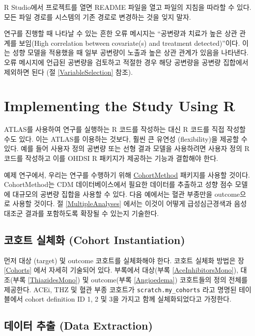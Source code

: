 \documentclass[11pt]{book}
\theoremstyle{definition}
\theoremstyle{definition}
\theoremstyle{definition}
\theoremstyle{remark}
\begin{document}
R Studio에서 프로젝트를 열면 README 파일을 열고 파일의 지침을 따라할 수
있다. 모든 파일 경로를 시스템의 기존 경로로 변경하는 것을 잊지 말자.

연구를 진행할 때 나타날 수 있는 흔한 오류 메시지는 ``공변량과 치료가
높은 상관 관계를 보임(High correlation between covariate(s) and
treatment detected)''이다. 이는 성향 모델을 적용했을 때 일부 공변량이
노출과 높은 상관 관계가 있음을 나타낸다. 오류 메시지에 언급된 공변량을
검토하고 적절한 경우 해당 공변량을 공변량 집합에서 제외하면 된다 (절
\ref{VariableSelection} 참조). 

\section{Implementing the Study Using R}\label{pleR}

ATLAS를 사용하여 연구를 실행하는 R 코드를 작성하는 대신 R 코드를 직접
작성할 수도 있다. 이는 ATLAS를 이용하는 것보다, 훨씬 큰 유연성
(flexibility)을 제공할 수 있다. 예를 들어 사용자 정의 공변량 또는 선형
결과 모델을 사용하려면 사용자 정의 R 코드를 작성하고 이를 OHDSI R
패키지가 제공하는 기능과 결합해야 한다.

예제 연구에서, 우리는 연구를 수행하기 위해
\href{https://ohdsi.github.io/CohortMethod/}{CohortMethod} 패키지를
사용할 것이다. CohortMethod는 CDM 데이터베이스에서 필요한 데이터를
추출하고 성향 점수 모델에 대규모의 공변량 집합을 사용할 수 있다. 다음
예에서는 혈관 부종만을 outcome으로 사용할 것이다. 절
\ref{MultipleAnalyses} 에서는 이것이 어떻게 급성심근경색과 음성 대조군
결과를 포함하도록 확장될 수 있는지 기술한다.

\subsection{코호트 실체화 (Cohort
Instantiation)}\label{--cohort-instantiation}

먼저 대상 (target) 및 outcome 코호트를 실체화해야 한다. 코호트 실체화
방법은 장 \ref{Cohorts} 에서 자세히 기술되어 있다. 부록에서 대상(부록
\ref{AceInhibitorsMono}), 대조(부록 \ref{ThiazidesMono}) 및 outcome(부록
\ref{Angioedema}) 코호트들의 정의 전체를 제공한다. ACEi, THZ 및 혈관
부종 코호트가 \texttt{scratch.my\_cohorts} 라고 명명된 테이블에서 cohort
definition ID 1, 2 및 3을 가지고 함께 실체화되었다고 가정한다.

\subsection{데이터 추출 (Data Extraction)}\label{--data-extraction-1}
\end{document}
